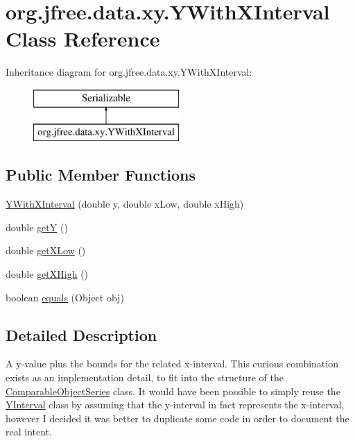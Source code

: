 \hypertarget{classorg_1_1jfree_1_1data_1_1xy_1_1_y_with_x_interval}{}\section{org.\+jfree.\+data.\+xy.\+Y\+With\+X\+Interval Class Reference}
\label{classorg_1_1jfree_1_1data_1_1xy_1_1_y_with_x_interval}
Inheritance diagram for org.\+jfree.\+data.\+xy.\+Y\+With\+X\+Interval\+:\begin{figure}[H]
\begin{center}
\leavevmode
\includegraphics[height=2.000000cm]{classorg_1_1jfree_1_1data_1_1xy_1_1_y_with_x_interval}
\end{center}
\end{figure}
\subsection*{Public Member Functions}
\begin{DoxyCompactItemize}
\item 
\mbox{\hyperlink{classorg_1_1jfree_1_1data_1_1xy_1_1_y_with_x_interval_af1971d0f1919e8c19dcd6735960e72ab}{Y\+With\+X\+Interval}} (double y, double x\+Low, double x\+High)
\item 
double \mbox{\hyperlink{classorg_1_1jfree_1_1data_1_1xy_1_1_y_with_x_interval_a02cb7fa3c59c125eb937d2d76ca1ad49}{getY}} ()
\item 
double \mbox{\hyperlink{classorg_1_1jfree_1_1data_1_1xy_1_1_y_with_x_interval_af30ba169f4a9543716540d1cde171fc1}{get\+X\+Low}} ()
\item 
double \mbox{\hyperlink{classorg_1_1jfree_1_1data_1_1xy_1_1_y_with_x_interval_a3e0afb19bd6871d133b25483bcf60ae9}{get\+X\+High}} ()
\item 
boolean \mbox{\hyperlink{classorg_1_1jfree_1_1data_1_1xy_1_1_y_with_x_interval_a31f3a0e15fe555d24ad7d27ac8425f28}{equals}} (Object obj)
\end{DoxyCompactItemize}


\subsection{Detailed Description}
A y-\/value plus the bounds for the related x-\/interval. This curious combination exists as an implementation detail, to fit into the structure of the \mbox{\hyperlink{classorg_1_1jfree_1_1data_1_1_comparable_object_series}{Comparable\+Object\+Series}} class. It would have been possible to simply reuse the \mbox{\hyperlink{classorg_1_1jfree_1_1data_1_1xy_1_1_y_interval}{Y\+Interval}} class by assuming that the y-\/interval in fact represents the x-\/interval, however I decided it was better to duplicate some code in order to document the real intent.

